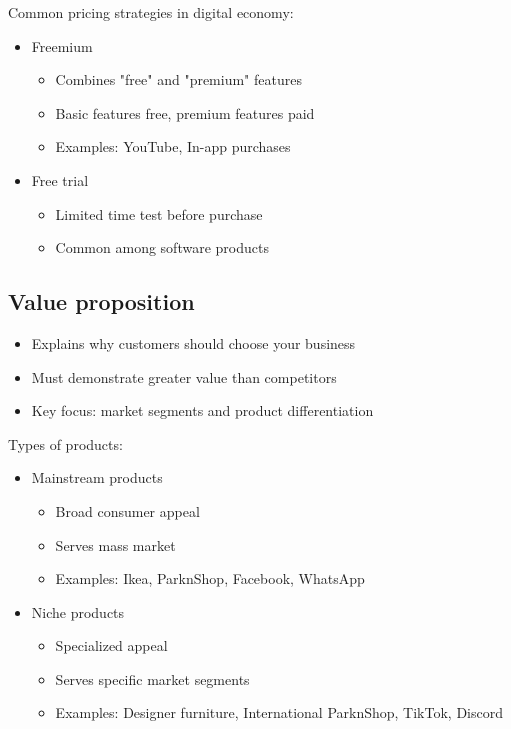 Common pricing strategies in digital economy:
\begin{itemize}
    \item Freemium
          \begin{itemize}
              \item Combines "free" and "premium" features
              \item Basic features free, premium features paid
              \item Examples: YouTube, In-app purchases
          \end{itemize}
    \item Free trial
          \begin{itemize}
              \item Limited time test before purchase
              \item Common among software products
          \end{itemize}
\end{itemize}

\subsection{Value proposition}

\begin{itemize}
    \item Explains why customers should choose your business
    \item Must demonstrate greater value than competitors
    \item Key focus: market segments and product differentiation
\end{itemize}

Types of products:
\begin{itemize}
    \item Mainstream products
          \begin{itemize}
              \item Broad consumer appeal
              \item Serves mass market
              \item Examples: Ikea, ParknShop, Facebook, WhatsApp
          \end{itemize}
    \item Niche products
          \begin{itemize}
              \item Specialized appeal
              \item Serves specific market segments
              \item Examples: Designer furniture, International ParknShop, TikTok, Discord
          \end{itemize}
\end{itemize}

